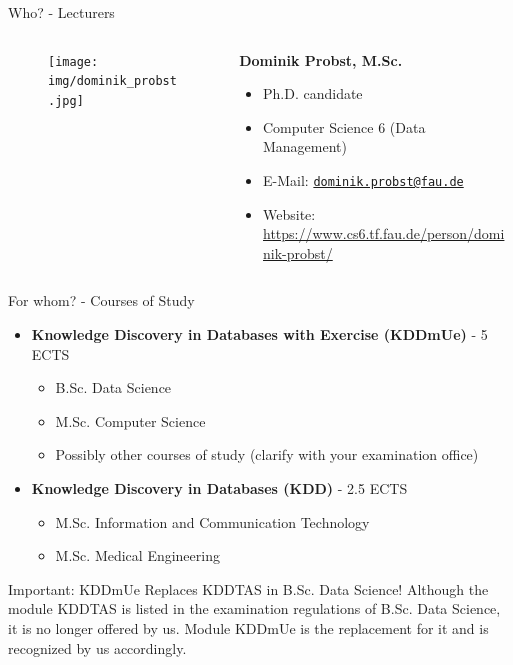 \begin{frame}{Who? - Lecturers}
	\begin{columns}[T]
		\begin{column}{0.2\textwidth}
			\vspace{-1em}
			\begin{figure}[t]
				\centering
				\texttt{[image: img/dominik\_probst.jpg]}
			\end{figure}
		\end{column}
		\begin{column}{0.8\textwidth}
			\textbf{Dominik Probst, M.Sc.}
			\begin{itemize}
				\item Ph.D. candidate
				\item Computer Science 6 (Data Management)
				\item E-Mail: \texttt{\href{mailto:dominik.probst@fau.de}{dominik.probst@fau.de}}
				\item Website: \url{https://www.cs6.tf.fau.de/person/dominik-probst/}
			\end{itemize}
		\end{column}
	\end{columns}
\end{frame}

\begin{frame}{For whom? - Courses of Study}
	\begin{itemize}
		\item \textbf{Knowledge Discovery in Databases with Exercise (KDDmUe)} - 5 ECTS
		      \begin{itemize}
			      \item B.Sc. Data Science
			      \item M.Sc. Computer Science
			      \item {\color{gray} Possibly other courses of study (clarify with your examination office)}
		      \end{itemize}
		\item \textbf{Knowledge Discovery in Databases (KDD)} - 2.5 ECTS
		      \begin{itemize}
			      \item M.Sc. Information and Communication Technology
			      \item M.Sc. Medical Engineering
		      \end{itemize}
	\end{itemize}

	\begin{alertblock}{Important: KDDmUe Replaces KDDTAS in B.Sc. Data Science!}
		Although the module KDDTAS is listed in the examination regulations of B.Sc. Data Science, it is no longer offered by us. Module KDDmUe is the replacement for it and is recognized by us accordingly.
	\end{alertblock}
\end{frame}

